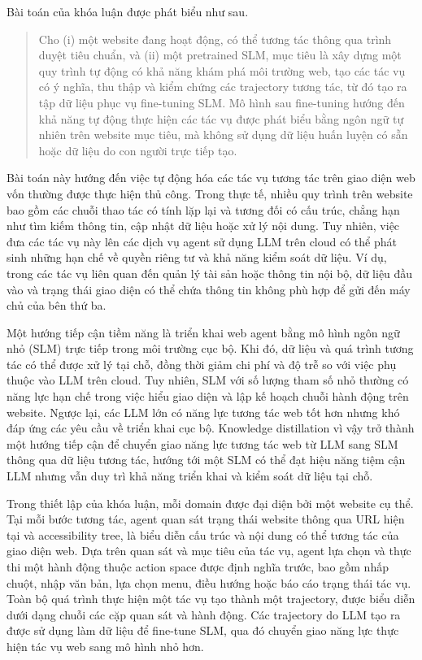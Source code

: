 Bài toán của khóa luận được phát biểu như sau.

\begin{quote}
  Cho (i) một website đang hoạt động, có thể tương tác thông qua trình duyệt tiêu chuẩn, và (ii) một pretrained SLM, mục tiêu là xây dựng một quy trình tự động có khả năng khám phá môi trường web, tạo các tác vụ có ý nghĩa, thu thập và kiểm chứng các trajectory tương tác, từ đó tạo ra tập dữ liệu phục vụ fine-tuning SLM. Mô hình sau fine-tuning hướng đến khả năng tự động thực hiện các tác vụ được phát biểu bằng ngôn ngữ tự nhiên trên website mục tiêu, mà không sử dụng dữ liệu huấn luyện có sẵn hoặc dữ liệu do con người trực tiếp tạo.
\end{quote}

Bài toán này hướng đến việc tự động hóa các tác vụ tương tác trên giao diện web vốn thường được thực hiện thủ công. Trong thực tế, nhiều quy trình trên website bao gồm các chuỗi thao tác có tính lặp lại và tương đối có cấu trúc, chẳng hạn như tìm kiếm thông tin, cập nhật dữ liệu hoặc xử lý nội dung. Tuy nhiên, việc đưa các tác vụ này lên các dịch vụ agent sử dụng LLM trên cloud có thể phát sinh những hạn chế về quyền riêng tư và khả năng kiểm soát dữ liệu. Ví dụ, trong các tác vụ liên quan đến quản lý tài sản hoặc thông tin nội bộ, dữ liệu đầu vào và trạng thái giao diện có thể chứa thông tin không phù hợp để gửi đến máy chủ của bên thứ ba.

Một hướng tiếp cận tiềm năng là triển khai web agent bằng mô hình ngôn ngữ nhỏ (SLM) trực tiếp trong môi trường cục bộ. Khi đó, dữ liệu và quá trình tương tác có thể được xử lý tại chỗ, đồng thời giảm chi phí và độ trễ so với việc phụ thuộc vào LLM trên cloud. Tuy nhiên, SLM với số lượng tham số nhỏ thường có năng lực hạn chế trong việc hiểu giao diện và lập kế hoạch chuỗi hành động trên website. Ngược lại, các LLM lớn có năng lực tương tác web tốt hơn nhưng khó đáp ứng các yêu cầu về triển khai cục bộ. Knowledge distillation vì vậy trở thành một hướng tiếp cận để chuyển giao năng lực tương tác web từ LLM sang SLM thông qua dữ liệu tương tác, hướng tới một SLM có thể đạt hiệu năng tiệm cận LLM nhưng vẫn duy trì khả năng triển khai và kiểm soát dữ liệu tại chỗ.

Trong thiết lập của khóa luận, mỗi domain được đại diện bởi một website cụ thể. Tại mỗi bước tương tác, agent quan sát trạng thái website thông qua URL hiện tại và accessibility tree, là biểu diễn cấu trúc và nội dung có thể tương tác của giao diện web. Dựa trên quan sát và mục tiêu của tác vụ, agent lựa chọn và thực thi một hành động thuộc action space được định nghĩa trước, bao gồm nhấp chuột, nhập văn bản, lựa chọn menu, điều hướng hoặc báo cáo trạng thái tác vụ. Toàn bộ quá trình thực hiện một tác vụ tạo thành một trajectory, được biểu diễn dưới dạng chuỗi các cặp quan sát và hành động. Các trajectory do LLM tạo ra được sử dụng làm dữ liệu để fine-tune SLM, qua đó chuyển giao năng lực thực hiện tác vụ web sang mô hình nhỏ hơn.


